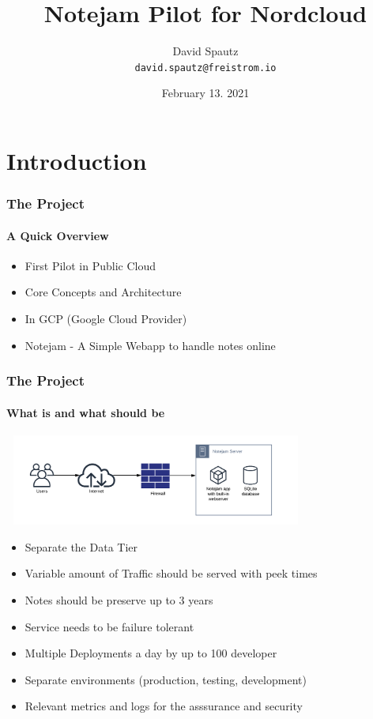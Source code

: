 \documentclass{beamer}
\title{Notejam Pilot for Nordcloud}
\author{David Spautz\\
\texttt{david.spautz@freistrom.io}}
\date{February 13. 2021}
\institute{Freistrom, Germany}
\begin{document}
  \begin{frame}
    \titlepage
  \end{frame}

  \section{Introduction}
  \begin{frame}
    \frametitle{The Project}
    \framesubtitle{A Quick Overview}
    \begin{itemize}
    \item First Pilot in Public Cloud
    \item Core Concepts and Architecture
    \item In GCP (Google Cloud Provider)
    \item Notejam - A Simple Webapp to handle notes online
  \end{itemize}
  \end{frame}

  \begin{frame}
  	\frametitle{The Project}
  	\framesubtitle{What is and what should be}
  	\center\includegraphics[width=10cm,height=3cm]{images/current_architecture.png}
  	\begin{itemize}
  		\item Separate the Data Tier
  		\item Variable amount of Traffic should be served with peek times
  		\item Notes should be preserve up to 3 years
  		\item Service needs to be failure tolerant
  		\item Multiple Deployments a day by up to 100 developer
  		\item Separate environments (production, testing, development)
  		\item Relevant metrics and logs for the asssurance and security 
  	\end{itemize}
  \end{frame}
\end{document}
